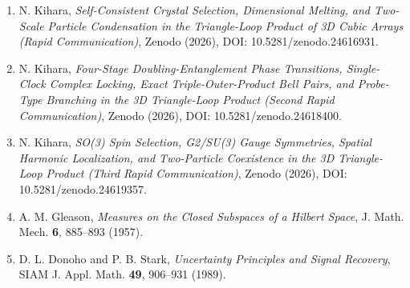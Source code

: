 \documentclass[
  a4paper,
]{article}
\providecommand{\tightlist}{%
  \setlength{\itemsep}{0pt}\setlength{\parskip}{0pt}}
\begin{document}
\begin{enumerate}
\def\labelenumi{\arabic{enumi}.}
\tightlist
\item
  N. Kihara, \emph{Self-Consistent Crystal Selection, Dimensional
  Melting, and Two-Scale Particle Condensation in the Triangle-Loop
  Product of 3D Cubic Arrays (Rapid Communication)}, Zenodo (2026), DOI:
  10.5281/zenodo.24616931.
\item
  N. Kihara, \emph{Four-Stage Doubling-Entanglement Phase Transitions,
  Single-Clock Complex Locking, Exact Triple-Outer-Product Bell Pairs,
  and Probe-Type Branching in the 3D Triangle-Loop Product (Second Rapid
  Communication)}, Zenodo (2026), DOI: 10.5281/zenodo.24618400.
\item
  N. Kihara, \emph{SO(3) Spin Selection, G2/SU(3) Gauge Symmetries,
  Spatial Harmonic Localization, and Two-Particle Coexistence in the 3D
  Triangle-Loop Product (Third Rapid Communication)}, Zenodo (2026),
  DOI: 10.5281/zenodo.24619357.
\item
  A. M. Gleason, \emph{Measures on the Closed Subspaces of a Hilbert
  Space}, J. Math. Mech. \textbf{6}, 885--893 (1957).
\item
  D. L. Donoho and P. B. Stark, \emph{Uncertainty Principles and Signal
  Recovery}, SIAM J. Appl. Math. \textbf{49}, 906--931 (1989).
\end{enumerate}
\end{document}
